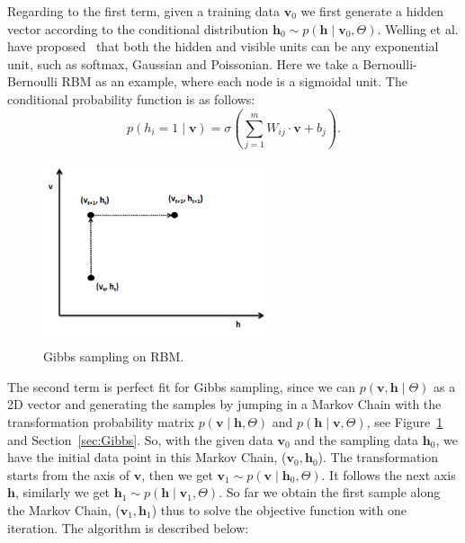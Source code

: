 Regarding to the first term, given a training data $ \mathbf{v}_0 $ we first generate a hidden vector according to the conditional distribution $ \mathbf{h}_0 \sim p( \mathbf{h} \mid \mathbf{v}_0, \Theta) $.
Welling et al. have proposed~\cite{welling2004exponential} that both the hidden and visible units can be any exponential unit, such as softmax, Gaussian and Poissonian.
Here we take a Bernoulli-Bernoulli RBM as an example, where each node is a sigmoidal unit.
The conditional probability function is as follows:
\begin{equation}
p(h_i = 1 \mid \mathbf{v}) = \sigma(\sum_{j=1}^{m} W_{ij} \cdot \mathbf{v} + b_j).
\end{equation}

\begin{figure}[hbt]
	\centering
	\includegraphics[width=0.6\textwidth]{pics_sdbn/gibbs.png}
	\caption{Gibbs sampling on RBM.}
	\label{fig:gibbs}
\end{figure}
The second term is perfect fit for Gibbs sampling, since we can $ p(\mathbf{v}, \mathbf{h} \mid \Theta) $ as a 2D vector and generating the samples by jumping in a Markov Chain with the transformation probability matrix $ p(\mathbf{v} \mid \mathbf{h}, \Theta) $ and $ p(\mathbf{h} \mid \mathbf{v}, \Theta) $, see Figure~\ref{fig:gibbs} and Section~\ref{sec:Gibbs}.
So, with the given data $ \mathbf{v}_0 $ and the sampling data $ \mathbf{h}_0 $, we have the initial data point in this Markov Chain,  ($ \mathbf{v}_0, \mathbf{h}_0$).
The transformation starts from the axis of $ \mathbf{v} $, then we get $ \mathbf{v}_1 \sim p( \mathbf{v} \mid \mathbf{h}_0, \Theta) $.
It follows the next axis $ \mathbf{h} $, similarly we get $ \mathbf{h}_1 \sim p( \mathbf{h} \mid \mathbf{v}_1, \Theta) $.
So far we obtain the first sample along the Markov Chain, ($ \mathbf{v}_1, \mathbf{h}_1$) thus to solve the objective function with one iteration.
The algorithm is described below:   

